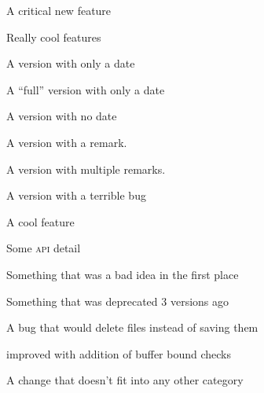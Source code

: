 \documentclass{article}
\begin{document}
\begin{changelog}[author=Rebecca Turner,
	sectioncmd=\subsection,
	title=Example changelog]
\begin{version}
\critical
	\item A critical new feature
\added
	\item Really cool features
\end{version}

\begin{version}[date=2019-01-23, short]
	A version with only a date
\end{version}

\begin{version}[date=2019-01-23]
\added
	\item A ``full'' version with only a date
\end{version}

\begin{version}[v=1.1.0, simple]
	\item A version with no date
\end{version}

\begin{version}[v=1.0.3, remark=Remark, simple]
	\item A version with a remark.
\end{version}

\begin{version}[v=1.0.2, remarks={Remark 1, Remark 2}, simple]
	\item A version with multiple remarks.
\end{version}

\begin{version}[v=1.0.1, yanked, simple]
	\item A version with a terrible bug
\end{version}

\begin{version}[v=1.0.0, date=2018-10-26]
\added
	\item A cool feature
\changed
	\item Some \textsc{api} detail
\deprecated
	\item Something that was a bad idea in the first place
\removed
	\item Something that was deprecated 3 versions ago
\fixed
	\item A bug that would delete files instead of saving them
\security
	\item improved with addition of buffer bound checks
\misc
	\item A change that doesn't fit into any other category
\end{version}

\end{changelog}
\end{document}
